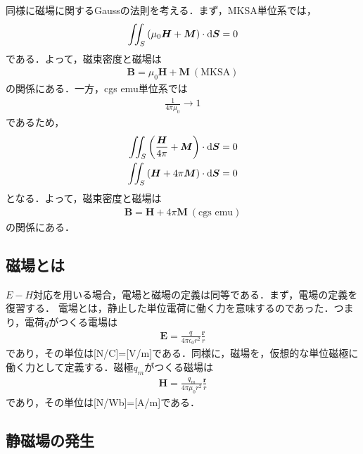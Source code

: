 \documentclass{report}
\begin{document}
  同様に磁場に関するGaussの法則を考える．まず，MKSA単位系では，
  \begin{align}
    \iint_{S} \qty(\mu_0 \bm{H} + \bm{M}) \cdot \dd{\bm{S}} = 0
  \end{align}
  である．よって，磁束密度と磁場は
  \begin{align}
    \bm{B} = \mu_0 \bm{H} + \bm{M}\ (\text{MKSA})
  \end{align}
  の関係にある．一方，cgs emu単位系では
  \begin{align}
    \frac{1}{4\pi\mu_0} \to 1
  \end{align}
  であるため，
  \begin{align}
    \iint_{S} \qty(\frac{\bm{H}}{4\pi} + \bm{M}) \cdot \dd{\bm{S}} &= 0\\
    \iint_{S} \qty(\bm{H} + 4\pi \bm{M}) \cdot \dd{\bm{S}} &= 0
  \end{align}
  となる．よって，磁束密度と磁場は
  \begin{align}
    \bm{B} = \bm{H} + 4\pi \bm{M}\ (\text{cgs emu})
  \end{align}
  の関係にある．

  \subsection{磁場とは}
  $E-H$対応を用いる場合，電場と磁場の定義は同等である．まず，電場の定義を復習する．
  電場とは，静止した単位電荷に働く力を意味するのであった．つまり，電荷$q$がつくる電場は
  \begin{align}
    \bm{E} = \frac{q}{4\pi\epsilon_0 r^2} \frac{\bm{r}}{r}
  \end{align}
  であり，その単位は[N/C]=[V/m]である．同様に，磁場を，仮想的な単位磁極に働く力として定義する．磁極$q_m$がつくる磁場は
  \begin{align}
    \bm{H} = \frac{q_{m}}{4\pi\mu_0 r^2} \frac{\bm{r}}{r}
  \end{align}
  であり，その単位は[N/Wb]=[A/m]である．

  \subsection{静磁場の発生}
\end{document}
